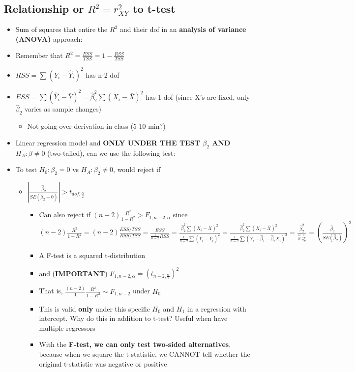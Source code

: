 \documentclass[10pt, oneside]{article}
\begin{document}
\subsection{Relationship or $R^2 = r^2 _{XY}$ to t-test}
\begin{itemize}
    \item Sum of squares that entire the $R^2$ and their dof in an \textbf{analysis of variance (ANOVA)} approach:
    \item Remember that $R^2 = \frac{ESS}{TSS} = 1- \frac{RSS}{TSS}$
    \item $RSS = \sum (Y_i - \hat Y_i)^2$ has n-2 dof
    \item $ESS = \sum (\hat Y_i - \bar Y)^2=\hat \beta_2 ^2 \sum (X_i - \bar X)^2$ has 1 dof (since X's are fixed, only $\hat \beta_2$ varies as sample changes)
    \begin{itemize}
        \item Not going over derivation in class (5-10 min?)
    \end{itemize}
    \item Linear regression model and \textbf{ONLY UNDER THE TEST $\beta_2$ AND $H_A : \beta\neq 0$} (two-tailed), can we use the following test:
    \item To test $H_0 : \beta_2 = 0$ vs $H_A:\beta_2 \neq 0$, would reject if
    \begin{itemize}
        \item $\left| \frac{\hat \beta_2}{SE(\hat \beta_2-0)}\right | > t_{dof,\frac{\alpha}{2}}$
        \begin{itemize}
            \item Can also reject if $(n-2)\frac{R^2}{1-R^2} > F_{1,n-2,\alpha}$ since \\ $(n-2) \frac{R^2}{1-R^2} = (n-2) \frac{ESS/TSS}{RSS/TSS} = \frac{ESS}{\frac{1}{n-2} RSS} = \frac{\hat \beta_2 ^2 \sum(X_i - \bar X)^2}{\frac{1}{n-2} \sum (Y_i - \hat Y_i )^2} = \frac{\hat \beta_2 ^2 \sum (X_i - \bar X)^2}{\frac{1}{n-2} \sum (Y_i -\hat \beta_1 -\hat \beta_2 X_i )^2} = \frac{\hat \beta_2 ^2}{\frac{s^2}{n} \frac{1}{\hat \sigma_X ^2}} = \left(\frac{\hat \beta_2}{SE(\hat \beta_2)}\right)^2$
            \item A F-test is a squared t-distribution
            \item and (\textbf{IMPORTANT}) $F_{1,n-2,\alpha} = (t_{n-2, \frac{\alpha}{2}})^2$
            \item That is, $\frac{(n-2)}{1}\frac{R^2}{1-R^2} \sim F_{1,n-2}$ under $H_0$
            \item This is valid \textbf{only} under this specific $H_0$ and $H_1$ in a regression with intercept. Why do this in addition to t-test? Useful when have multiple regressors
            \item With the \textbf{F-test, we can only test two-sided alternatives}, because when we square the t-statistic, we CANNOT tell whether the original t-statistic was negative or positive
        \end{itemize}
    \end{itemize}
\end{itemize}
\end{document}
